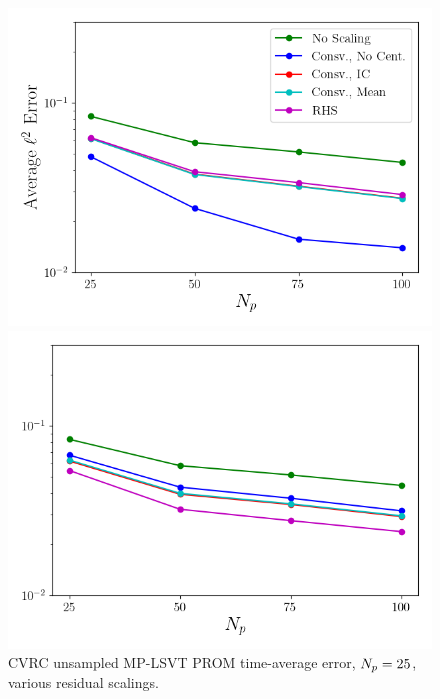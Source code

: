 \begin{figure}
	\begin{minipage}{0.49\linewidth}
		\includegraphics[width=0.99\linewidth]{Chapters/BestPractices/Images/errVsModes_norm_l2_Average_errorRaw.png}
	\end{minipage}
	\begin{minipage}{0.49\linewidth}
		\includegraphics[width=0.99\linewidth]{Chapters/BestPractices/Images/errVsModes_norm_minmax_Average_errorRaw.png}
	\end{minipage}
	\caption{CVRC unsampled MP-LSVT PROM time-average error, $N_p = 25$, various residual scalings.}
\end{figure}

